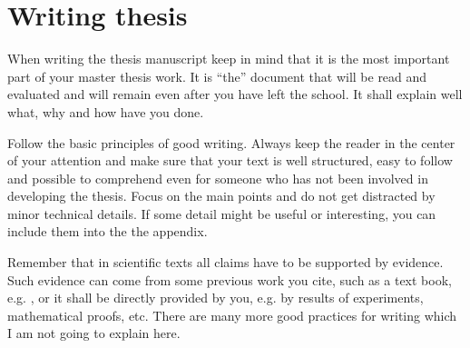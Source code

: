 \section{Writing thesis}\label{sec:Intro_writing}
When writing the thesis manuscript keep in mind that it is the most important part of your master thesis work.
It is ``the'' document that will be read and evaluated and will remain even after you have left the school.
It shall explain well what, why and how have you done.

Follow the basic principles of good writing. 
Always keep the reader in the center of your attention and make sure that your text is well structured, easy to follow and possible to comprehend even for someone who has not been involved in developing the thesis.
Focus on the main points and do not get distracted by minor technical details.
If some detail might be useful or interesting, you can include them into the the appendix.

Remember that in scientific texts all claims have to be supported by evidence.
Such evidence can come from some previous work you cite, such as a text book, e.g. \cite{bishopPatternRecognitionMachine2006},
or it shall be directly provided by you, e.g. by results of experiments, mathematical proofs, etc.
There are many more good practices for writing which I am not going to explain here.